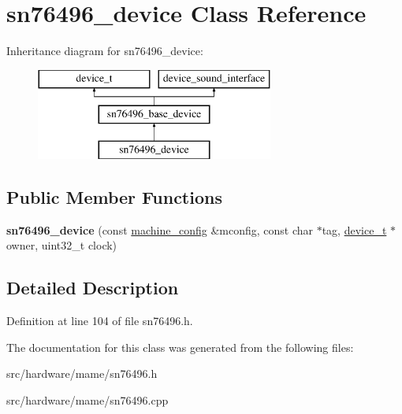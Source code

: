 \hypertarget{classsn76496__device}{\section{sn76496\-\_\-device Class Reference}
\label{classsn76496__device}
}
Inheritance diagram for sn76496\-\_\-device\-:\begin{figure}[H]
\begin{center}
\leavevmode
\includegraphics[height=3.000000cm]{classsn76496__device}
\end{center}
\end{figure}
\subsection*{Public Member Functions}
\begin{DoxyCompactItemize}
\item 
\hypertarget{classsn76496__device_adc168109c27e065d683800243c49f739}{{\bfseries sn76496\-\_\-device} (const \hyperlink{structmachine__config}{machine\-\_\-config} \&mconfig, const char $\ast$tag, \hyperlink{classdevice__t}{device\-\_\-t} $\ast$owner, uint32\-\_\-t clock)}\label{classsn76496__device_adc168109c27e065d683800243c49f739}

\end{DoxyCompactItemize}


\subsection{Detailed Description}


Definition at line 104 of file sn76496.\-h.



The documentation for this class was generated from the following files\-:\begin{DoxyCompactItemize}
\item 
src/hardware/mame/sn76496.\-h\item 
src/hardware/mame/sn76496.\-cpp\end{DoxyCompactItemize}
